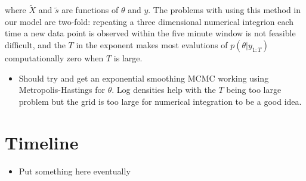 \documentclass[12pt,a4paper]{article}%
\numberwithin{equation}{section}
\begin{document}
where $\widetilde{X}$ and $\tilde{s}$ are functions of $\theta$ and $y$. The problems with using this method in our model are two-fold: repeating a three dimensional numerical integrion each time a new data point is observed within the five minute window is not feasible difficult, and the $T$ in the exponent makes most evalutions of $p(\theta | y_{1:T})$ computationally zero when $T$ is large. 

\begin{itemize}
\item Should try and get an exponential smoothing MCMC working using Metropolis-Hastings for $\theta$. Log densities help with the $T$ being too large problem but the grid is too large for numerical integration to be a good idea.
\end{itemize}

\section{Timeline}
\begin{itemize}
\item Put something here eventually
\end{itemize}



\end{document}
